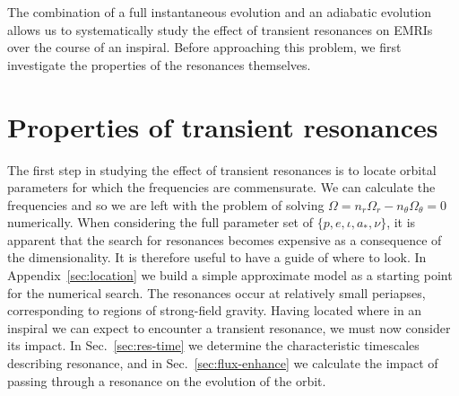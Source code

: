 \documentclass[aps,prd,amsfonts,amssymb,amsmath,nofootinbib,showpacs,superscriptaddress,twocolumn]{revtex4}
\newcommand{\eqnref}[1]{(\ref{eq:#1})}
\newcommand{\secref}[1]{Sec.~\ref{sec:#1}}
\newcommand{\apref}[1]{Appendix~\ref{sec:#1}}
\newcommand{\dd}{\ensuremath{\mathrm{d}}}
\newcommand{\diff}[2]{\ensuremath{\dfrac{\dd {#1}}{\dd {#2}}}}
\begin{document}

The combination of a full instantaneous evolution and an adiabatic evolution allows us to systematically study the effect of transient resonances on EMRIs over the course of an inspiral. Before approaching this problem, we first investigate the properties of the resonances themselves.


\section{Properties of transient resonances}
\label{sec:properties}

The first step in studying the effect of transient resonances is to locate orbital parameters for which the frequencies are commensurate. We can calculate the frequencies and so we are left with the problem of solving $\Omega = n_r \Omega_r - n_\theta \Omega_\theta = 0$ numerically. When considering the full parameter set of $\{p,e,\iota,a_\ast,\nu\}$, it is apparent that the search for resonances becomes expensive as a consequence of the dimensionality. It is therefore useful to have a guide of where to look. In \apref{location} we build a simple approximate model as a starting point for the numerical search. The resonances occur at relatively small periapses, corresponding to regions of strong-field gravity. Having located where in an inspiral we can expect to encounter a transient resonance, we must now consider its impact. In \secref{res-time} we determine the characteristic timescales describing resonance, and in \secref{flux-enhance} we calculate the impact of passing through a resonance on the evolution of the orbit.
\end{document}
